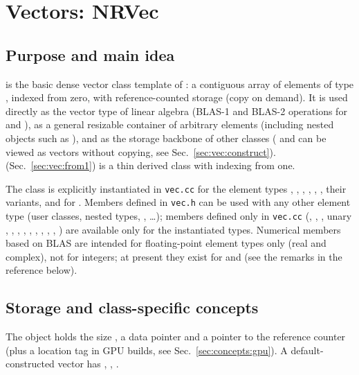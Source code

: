 \chapter{Vectors: NRVec}\label{ch:vec}


\section{Purpose and main idea}\label{sec:vec:purpose}

 is the basic dense vector class template of \LA{}: a contiguous array of  elements of type ,
indexed from zero, with reference-counted storage (copy on demand). It is used directly as the vector type of linear algebra
(BLAS-1 and BLAS-2 operations for  and ), as a general resizable container of arbitrary
elements (including nested \LA{} objects such as ), and as the storage backbone of other classes
( and  can be viewed as vectors without copying, see Sec.~\ref{sec:vec:construct}).
 (Sec.~\ref{sec:vec:from1}) is a thin derived class with indexing from one.

The class is explicitly instantiated in \texttt{vec.cc} for the element types , , , ,
, , their  variants, and for . Members defined in
\texttt{vec.h} can be used with any other element type (user classes, nested \LA{} types, , \dots); members defined
only in \texttt{vec.cc} (, , , unary , ,
, , , , , ,
, ) are available only for the instantiated types. Numerical members based on BLAS are intended
for floating-point element types only (real and complex), not for integers; at present they exist for  and
 (see the remarks in the reference below).

\section{Storage and class-specific concepts}\label{sec:vec:storage}

The object holds the size , a data pointer  and a pointer  to the reference counter
(plus a location tag in GPU builds, see Sec.~\ref{sec:concepts:gpu}). A default-constructed vector has , ,
.

